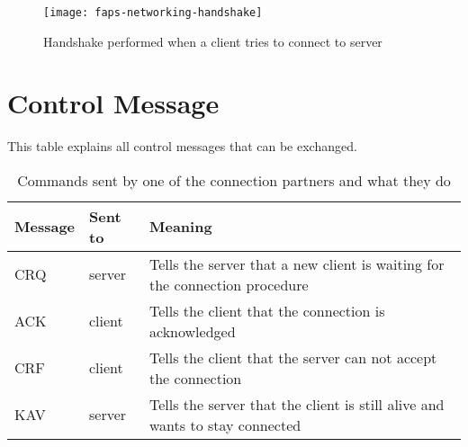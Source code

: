 \begin{figure}[H]
    \centering
    \texttt{[image: faps-networking-handshake]}
    \caption{Handshake performed when a client tries to connect to server}
    \label{fig:faps-networking-handshake}
\end{figure}

\section{Control Message}

This table explains all control messages that can be exchanged.

\begin{table}[H]
    \centering
    \begin{tabular}{| l | l | p{5cm} |}
    \hline
    \textbf{Message} & \textbf{Sent to} & \textbf{Meaning} \\ \hline
    CRQ & server & Tells the server that a new client is waiting for the connection procedure \\ \hline
    ACK & client & Tells the client that the connection is acknowledged \\ \hline
    CRF & client & Tells the client that the server can not accept the connection \\ \hline
    KAV & server & Tells the server that the client is still alive and wants to stay connected \\ \hline
    \hline
    \end{tabular}
    \caption{Commands sent by one of the connection partners and what they do}
    \label{tab:commands}
\end{table}

